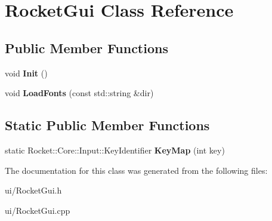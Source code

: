 \hypertarget{classRocketGui}{\section{\-Rocket\-Gui \-Class \-Reference}
\label{classRocketGui}
}
\subsection*{\-Public \-Member \-Functions}
\begin{DoxyCompactItemize}
\item 
\hypertarget{classRocketGui_a4f691471d7020a96927a7c088a012f5e}{void {\bfseries \-Init} ()}\label{classRocketGui_a4f691471d7020a96927a7c088a012f5e}

\item 
\hypertarget{classRocketGui_ac0ea255da87a09aec8eba70baded36a6}{void {\bfseries \-Load\-Fonts} (const std\-::string \&dir)}\label{classRocketGui_ac0ea255da87a09aec8eba70baded36a6}

\end{DoxyCompactItemize}
\subsection*{\-Static \-Public \-Member \-Functions}
\begin{DoxyCompactItemize}
\item 
\hypertarget{classRocketGui_aff1e0f90e610d1371450137d9cb3a305}{static \*
\-Rocket\-::\-Core\-::\-Input\-::\-Key\-Identifier {\bfseries \-Key\-Map} (int key)}\label{classRocketGui_aff1e0f90e610d1371450137d9cb3a305}

\end{DoxyCompactItemize}


\-The documentation for this class was generated from the following files\-:\begin{DoxyCompactItemize}
\item 
ui/\-Rocket\-Gui.\-h\item 
ui/\-Rocket\-Gui.\-cpp\end{DoxyCompactItemize}
